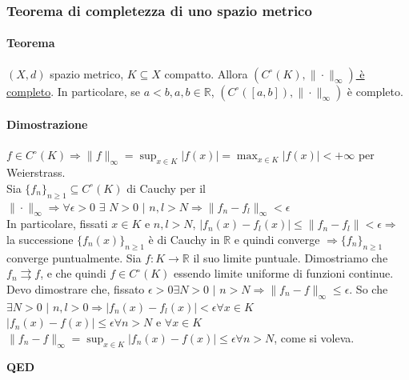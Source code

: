 \documentclass{article}
\newcommand{\R}{\mathbb{R}}
\begin{document}

\subsubsection{Teorema di completezza di uno spazio metrico}
\paragraph{Teorema}
$(X,d)$ spazio metrico, $K \subseteq X$ compatto. Allora \underline{$(C^\circ(K), \|\cdot\|_\infty)$ è completo}. In particolare, se $a < b, a, b \in \R$, $(C^\circ([a,b]),\|\cdot\|_\infty)$ è completo.

\paragraph{{Dimostrazione}}
$f \in C^\circ(K) \Rightarrow \| f\|_\infty = \sup_{x \in K}|f(x)|= \max_{x \in K}|f(x)|< +\infty$ per Weierstrass.\\
Sia $\{f_n\}_{n \geq 1}\subseteq C^\circ(K)$ di Cauchy per il $\| \cdot\|_\infty \Rightarrow \forall \epsilon >0\,\,  \exists \,\, N >0 \,\, |\,\, n , l >N \Rightarrow \| f_n-f_l \|_\infty <\epsilon$\\
In particolare, fissati $x \in K$ e $n,l >N$, $|f_n(x)-f_l(x)|\leq \| f_n-f_l \|< \epsilon \Rightarrow$ la successione $\{f_n(x)\}_{n \geq 1}$ è di Cauchy in $\R$ e quindi converge $\Rightarrow \{f_n\}_{n \geq 1}$ converge puntualmente. Sia $ f: K \rightarrow \R$ il suo limite puntuale. Dimostriamo che $ f_n \rightrightarrows f$, e che quindi $f \in C^\circ(K)$ essendo limite uniforme di funzioni continue.\\
Devo dimostrare che, fissato $\epsilon >0  \exists N >0  \,\, | \,\, n >N \Rightarrow \| f_n-f\|_\infty \leq \epsilon$. So che $\exists N >0 \,\, | \,\, n,l>0 \Rightarrow |f_n(x)-f_l(x)|< \epsilon \forall x \in K$ \\
$|f_n(x)-f(x)| \leq \epsilon \forall n > N$ e $\forall x \in K$\\
$\| f_n-f\|_\infty = \sup_{x \in K}|f_n(x)-f(x)| \leq \epsilon \forall n > N$, come si voleva.
\begin{flushright}
\textbf{QED}
\end{flushright}
\end{document}
